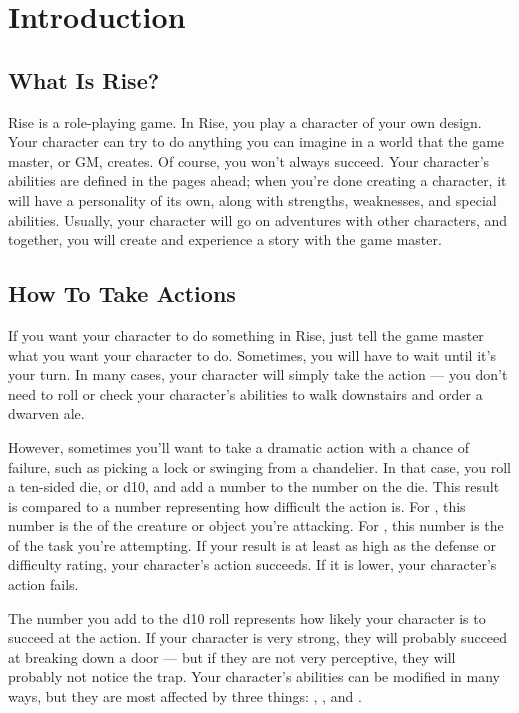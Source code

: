 \chapter{Introduction}

\section{What Is Rise?}
    Rise is a role-playing game.
    In Rise, you play a character of your own design.
    Your character can try to do anything you can imagine in a world that the game master, or GM, creates.
    Of course, you won't always succeed.
    Your character's abilities are defined in the pages ahead; when you're done creating a character, it will have a personality of its own, along with strengths, weaknesses, and special abilities.
    Usually, your character will go on adventures with other characters, and together, you will create and experience a story with the game master.

\section{How To Take Actions}

    If you want your character to do something in Rise, just tell the game master what you want your character to do.
    Sometimes, you will have to wait until it's your turn.
    In many cases, your character will simply take the action --- you don't need to roll or check your character's abilities to walk downstairs and order a dwarven ale.

    However, sometimes you'll want to take a dramatic action with a chance of failure, such as picking a lock or swinging from a chandelier.
    In that case, you roll a ten-sided die, or d10, and add a number to the number on the die.
    This result is compared to a number representing how difficult the action is.
    For , this number is the  of the creature or object you're attacking.
    For , this number is the  of the task you're attempting.
    If your result is at least as high as the defense or difficulty rating, your character's action succeeds.
    If it is lower, your character's action fails.

    The number you add to the d10 roll represents how likely your character is to succeed at the action.
    If your character is very strong, they will probably succeed at breaking down a door --- but if they are not very perceptive, they will probably not notice the trap.
    Your character's abilities can be modified in many ways, but they are most affected by three things: , , and .

